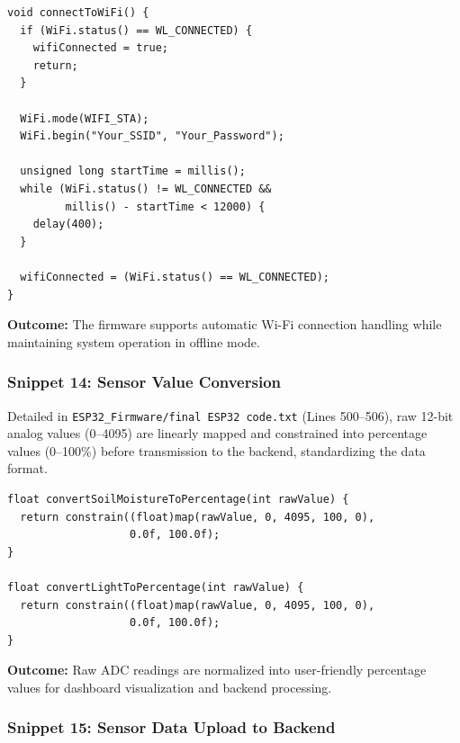 \begin{lstlisting}
void connectToWiFi() {
  if (WiFi.status() == WL_CONNECTED) {
    wifiConnected = true;
    return;
  }

  WiFi.mode(WIFI_STA);
  WiFi.begin("Your_SSID", "Your_Password");

  unsigned long startTime = millis();
  while (WiFi.status() != WL_CONNECTED &&
         millis() - startTime < 12000) {
    delay(400);
  }

  wifiConnected = (WiFi.status() == WL_CONNECTED);
}
\end{lstlisting}

\textbf{Outcome:} The firmware supports automatic Wi-Fi connection 
handling while maintaining system operation in offline mode.

\subsubsection{Snippet 14: Sensor Value Conversion}
\label{subsec:snippet14}

Detailed in \texttt{ESP32\_Firmware/final ESP32 code.txt} (Lines 500--506), raw 12-bit analog values (0--4095) are linearly mapped and constrained into 
percentage values (0--100\%) before transmission to the backend, standardizing the data format.

\begin{lstlisting}
float convertSoilMoistureToPercentage(int rawValue) {
  return constrain((float)map(rawValue, 0, 4095, 100, 0),
                   0.0f, 100.0f);
}

float convertLightToPercentage(int rawValue) {
  return constrain((float)map(rawValue, 0, 4095, 100, 0),
                   0.0f, 100.0f);
}
\end{lstlisting}

\textbf{Outcome:} Raw ADC readings are normalized into 
user-friendly percentage values for dashboard visualization and 
backend processing.

\subsubsection{Snippet 15: Sensor Data Upload to Backend}
\label{subsec:snippet15}

